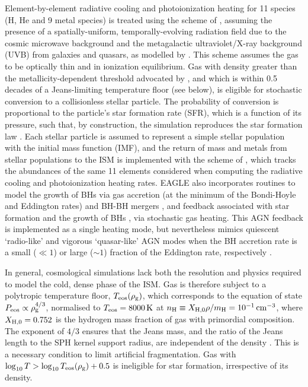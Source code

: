 \documentclass[fleqn,usenatbib]{mnras}
\newcommand{\K}              {\,{\rm K}}
\newcommand{\cmcubed}              {\,{\rm cm}^{-3}}
\begin{document}
Element-by-element radiative cooling and photoionization heating for 11 species (H, He and 9 metal species) is treated using the scheme of \citet{Wiersma_Schaye_and_Smith_09}, assuming the presence of a spatially-uniform, temporally-evolving radiation field due to the cosmic microwave background and the metagalactic ultraviolet/X-ray background (UVB) from galaxies and quasars, as modelled by \citet{Haardt_and_Madau_01}. This scheme assumes the gas to be optically thin and in ionization equilibrium. Gas with density greater than the metallicity-dependent threshold advocated by \citet{Schaye_04}, and which is within 0.5 decades of a Jeans-limiting temperature floor (see below), is eligible for stochastic conversion to a collisionless stellar particle. The probability of conversion is proportional to the particle's star formation rate (SFR), which is a function of its pressure, such that, by construction, the simulation reproduces the \citet{Kennicutt_review_98} star formation law \citep{Schaye_and_Dalla_Vecchia_08}. Each stellar particle is assumed to represent a simple stellar population with the \citet{Chabrier_03} initial mass function (IMF), and the return of mass and metals from stellar populations to the ISM is implemented with the scheme of \citet{Wiersma_et_al_09}, which tracks the abundances of the same 11 elements considered when computing the radiative cooling and photoionization heating rates. EAGLE also incorporates routines to model the growth of BHs via gas accretion (at the minimum of the Bondi-Hoyle and Eddington rates) and BH-BH mergers \citep{Springel_Di_Matteo_and_Hernquist_05,Rosas_Guevara_et_al_15_short,S15}, and feedback associated with star formation \citep{Dalla_Vecchia_and_Schaye_12} and the growth of BHs \citep{Booth_and_Schaye_09,S15}, via stochastic gas heating. This AGN feedback is implemented as a single heating mode, but nevertheless mimics quiescent `radio-like' and vigorous `quasar-like' AGN modes when the BH accretion rate is a small ($\ll 1$) or large ($\sim 1$) fraction of the Eddington rate, respectively \citep[][]{McCarthy_et_al_11}. 

In general, cosmological simulations lack both the resolution and physics required to model the cold, dense phase of the ISM. Gas is therefore subject to a polytropic temperature floor, $T_{\rm eos}(\rho_{\rm g})$, which corresponds to the equation of state $P_{\rm eos} \propto \rho_{\rm g}^{4/3}$, normalised to $T_{\rm eos} = 8000\K$ at $n_{\rm H} \equiv X_{\rm H,0}\rho/m_{\rm H} = 10^{-1} \cmcubed$, where $X_{\rm H,0}=0.752$ is the hydrogen mass fraction of gas with primordial composition. The exponent of $4/3$ ensures that the Jeans mass, and the ratio of the Jeans length to the SPH kernel support radius, are independent of the density \citep{Schaye_and_Dalla_Vecchia_08}. This is a necessary condition to limit artificial fragmentation. Gas with $\log_{10} T > \log_{10} T_{\rm eos}(\rho_{\rm g}) + 0.5$ is ineligible for star formation, irrespective of its density. 
\end{document}
